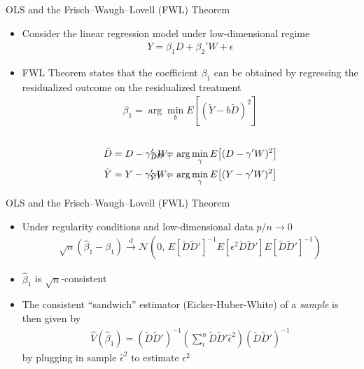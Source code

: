 \documentclass[aspectratio=1610,12pt,xcolor=dvipsnames]{beamer}
\begin{document}
\begin{frame}{OLS and the Frisch--Waugh--Lovell (FWL) Theorem}

\begin{itemize}
    \item Consider the linear regression model under low-dimensional regime
    \begin{align*}
        Y = \beta_1 D + \beta_2'W + \epsilon
    \end{align*}

    \item FWL Theorem states that the coefficient $\beta_1$ can be obtained by regressing the residualized outcome on the residualized treatment
    \begin{align*}
        \beta_1
        =
        \arg\min_{b}
        E\!\left[(\tilde Y-b\tilde D)^2\right]
    \end{align*} \\[-2em]
    \begin{align*}
        \tilde D &= D-\gamma_D'W;
        &\hspace{-3em}
        \gamma_D
        &=\arg\min_{\gamma}
        E\!\left[(D-\gamma'W)^2\right] \\
        \tilde Y &= Y-\gamma_Y'W;
        &\hspace{-3em}
        \gamma_Y
        &=\arg\min_{\gamma}
        E\!\left[(Y-\gamma'W)^2\right]
    \end{align*}
\end{itemize}
\end{frame}

\begin{frame}{OLS and the Frisch--Waugh--Lovell (FWL) Theorem}

\begin{itemize}
    \item Under regularity conditions and low-dimensional data $p/n \rightarrow 0$
    \begin{align*}
    \sqrt{n}\left(\hat{\beta}_1-\beta_1\right)
    \xrightarrow{d}
    \mathcal{N}\!\left(
    0,\,
    E\!\left[\tilde D\tilde D'\right]^{-1}
    E\!\left[\epsilon^2\tilde D\tilde D'\right]
    E\!\left[\tilde D\tilde D'\right]^{-1}
    \right)
\end{align*}
    \item $\hat \beta_1$ is $\sqrt n$-consistent
    \item The consistent ``sandwich'' estimator (Eicker-Huber-White) of a \textit{sample} is then given by
\begin{align*}
    \hat{V}(\hat{\beta}_1) = \left(\tilde D \tilde D'\right)^{-1}\left( \sum_i^{n} \tilde D \tilde D'\hat{\epsilon}^{2} \right) \left(\tilde D \tilde D'\right)^{-1}
\end{align*}
by plugging in sample $\hat \epsilon^2$ to estimate $\epsilon^2$
\end{itemize}
\end{frame}
\end{document}
